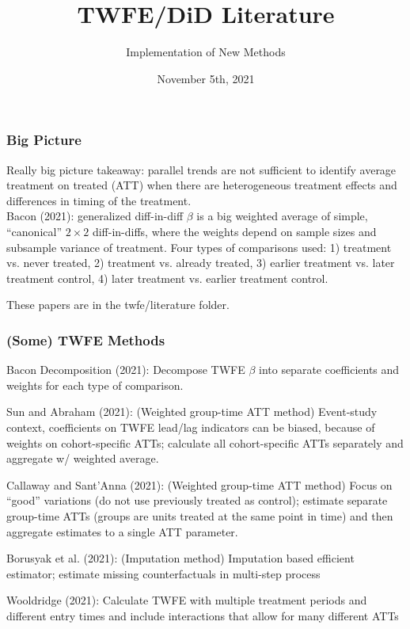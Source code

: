 \documentclass{beamer}
\title{TWFE/DiD Literature}
\author{Implementation of New Methods}
\institute{Columbia University, Sustainable Development Colloquium}
\date{November 5th, 2021}
\newenvironment{wideitemize}{\itemize\addtolength{\itemsep}{8pt}}{\enditemize}
\begin{document}
\frame{\titlepage}

\begin{frame}
\frametitle{Big Picture}
{\color{yellow} Really big picture takeaway:} parallel trends are not sufficient to identify average treatment on treated (ATT) when there are heterogeneous treatment effects and differences in timing of the treatment. \\ \bigskip
{\color{yellow} Bacon (2021):} generalized diff-in-diff $\beta$ is a big weighted average of simple, ``canonical'' $2\times2$ diff-in-diffs, where the weights depend on sample sizes and subsample variance of treatment. Four types of comparisons used: 1) treatment vs. never treated, 2) treatment vs. already treated, 3) earlier treatment vs. later treatment control, 4) later treatment vs. earlier treatment control.

\end{frame}

\begin{frame}
These papers are in the {\color{red} twfe/literature} folder.
\frametitle{(Some) TWFE Methods}
\footnotesize{
\begin{wideitemize}
	\item {\color{yellow} Bacon Decomposition (2021):} Decompose TWFE $\beta$ into separate coefficients and weights for each type of comparison.
	\item {\color{yellow} Sun and Abraham (2021):}  (Weighted group-time ATT method) Event-study context, coefficients on TWFE lead/lag indicators can be biased, because of weights on cohort-specific ATTs; calculate all cohort-specific ATTs separately and aggregate w/ weighted average.
	\item {\color{yellow} Callaway and Sant'Anna (2021):} (Weighted group-time ATT method)  Focus on ``good'' variations (do not use previously treated as control); estimate separate group-time ATTs (groups are units treated at the same point in time) and then aggregate estimates to a single ATT parameter.
	\item {\color{yellow} Borusyak et al. (2021):} (Imputation method) Imputation based efficient estimator; estimate missing counterfactuals in multi-step process 
	\item {\color{yellow} Wooldridge (2021):} Calculate TWFE with multiple treatment periods and different entry times and include interactions that allow for many different ATTs
\end{wideitemize}
}
\end{frame}
\end{document}
